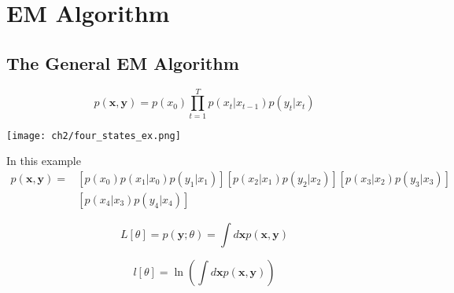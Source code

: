 \chapter{EM Algorithm}

\section{The General EM Algorithm}
\begin{definition}
    \begin{equation}
        p(\textbf{x}, \textbf{y})= p(x_0)\prod_{t=1}^{T} p(x_{t}|x_{t-1}) p(y_t|x_t)
    \end{equation}
    \begin{center}
        \texttt{[image: ch2/four\_states\_ex.png]}   
    \end{center}
In this example
    \begin{equation}
    \begin{split}
        p(\textbf{x}, \textbf{y})= &[p(x_0) p(x_1|x_0) p(y_1|x_1)] [p(x_2|x_1) p(y_2|x_2)]  [p(x_3|x_2) p(y_3|x_3)] \\
        &[p(x_4|x_3) p(y_4|x_4)]
    \end{split}
    \end{equation}
\end{definition}

\begin{definition}
\begin{equation}
    L[\theta] = p(\textbf{y};\theta) = \int d\textbf{x}p(\textbf{x}, \textbf{y})
\end{equation}
\end{definition}

\begin{definition}
\begin{equation}
    l[\theta] = \ln{(\int d\textbf{x}p(\textbf{x}, \textbf{y}))}
\end{equation}
\end{definition}

